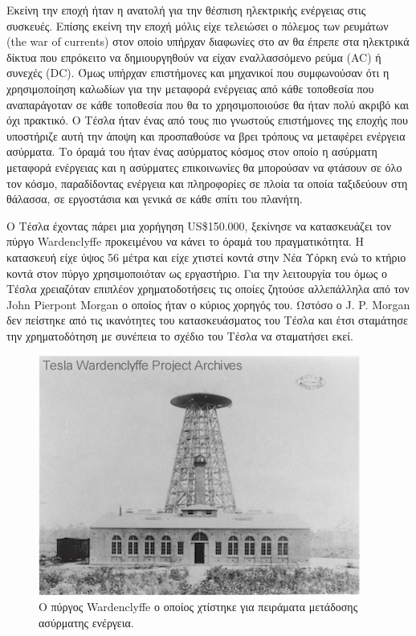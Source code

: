 Εκείνη την εποχή ήταν η ανατολή για την θέσπιση ηλεκτρικής ενέργειας στις συσκευές. Επίσης εκείνη την εποχή μόλις είχε τελειώσει ο πόλεμος των ρευμάτων (the war of
currents) στον οποίο υπήρχαν διαφωνίες στο αν θα έπρεπε στα ηλεκτρικά δίκτυα που επρόκειτο να δημιουργηθούν να είχαν εναλλασσόμενο ρεύμα (AC) ή συνεχές (DC). Όμως
υπήρχαν επιστήμονες και μηχανικοί που συμφωνούσαν ότι η χρησιμοποίηση καλωδίων για την μεταφορά ενέργειας από κάθε τοποθεσία που αναπαράγοταν σε κάθε τοποθεσία που
θα το χρησιμοποιούσε θα ήταν πολύ ακριβό και όχι πρακτικό. Ο Τέσλα ήταν ένας από τους πιο γνωστούς επιστήμονες της εποχής που υποστήριζε αυτή την άποψη και
προσπαθούσε να βρει τρόπους να μεταφέρει ενέργεια ασύρματα. Το όραμά του ήταν ένας ασύρματος κόσμος στον οποίο η ασύρματη μεταφορά ενέργειας και η ασύρματες
επικοινωνίες θα μπορούσαν να φτάσουν σε όλο τον κόσμο, παραδίδοντας ενέργεια και πληροφορίες σε πλοία τα οποία ταξιδεύουν στη θάλασσα, σε εργοστάσια και γενικά σε
κάθε σπίτι του πλανήτη.

Ο Τέσλα έχοντας πάρει μια χορήγηση US\$150.000, ξεκίνησε να κατασκευάζει τον πύργο Wardenclyffe προκειμένου να κάνει το όραμά του πραγματικότητα. Η κατασκευή είχε
ύψος 56 μέτρα και είχε χτιστεί κοντά στην Νέα Υόρκη ενώ το κτήριο κοντά στον πύργο χρησιμοποιόταν ως εργαστήριο. Για την λειτουργία του όμως ο Tέσλα χρειαζόταν
επιπλέον χρηματοδοτήσεις τις οποίες ζητούσε αλλεπάλληλα από τον John Pierpont Morgan ο οποίος ήταν ο κύριος χορηγός του. Ωστόσο ο J. P. Morgan δεν πείστηκε από τις
ικανότητες του κατασκευάσματος του Τέσλα και έτσι σταμάτησε την χρηματοδότηση με συνέπεια το σχέδιο του Τέσλα να σταματήσει εκεί.

\begin{figure}[h]
	\centering
	\includegraphics[width=\textwidth]{images/Wardenclyffe_Tower.jpg}
	\caption{Ο πύργος Wardenclyffe ο οποίος χτίστηκε για πειράματα μετάδοσης ασύρματης ενέργεια.}
	\label{fig:Wardenclyffe_Tower}
\end{figure}

